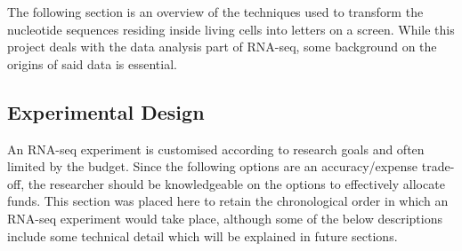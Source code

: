The following section is an overview of the techniques used to transform the nucleotide sequences residing inside living cells into letters on a screen. While this project deals with the data analysis part of RNA-seq, some background on the origins of said data is essential. 


\subsection{Experimental Design}


An RNA-seq experiment is customised according to research goals and often limited by the budget. Since the following options are an accuracy/expense trade-off, the researcher should be knowledgeable on the options to effectively allocate funds. This section was placed here to retain the chronological order in which an RNA-seq experiment would take place, although some of the below descriptions include some technical detail which will be explained in future sections.

